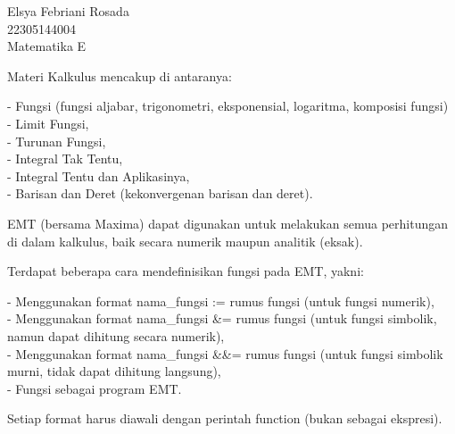 \documentclass{article}
\begin{document}
\begin{eulernotebook}
\begin{eulercomment}
Elsya Febriani Rosada\\
22305144004\\
Matematika E

\begin{eulercomment}
\begin{eulercomment}
Materi Kalkulus mencakup di antaranya:

- Fungsi (fungsi aljabar, trigonometri, eksponensial, logaritma,
komposisi fungsi)\\
- Limit Fungsi,\\
- Turunan Fungsi,\\
- Integral Tak Tentu,\\
- Integral Tentu dan Aplikasinya,\\
- Barisan dan Deret (kekonvergenan barisan dan deret).

EMT (bersama Maxima) dapat digunakan untuk melakukan semua perhitungan
di dalam kalkulus, baik secara numerik maupun analitik (eksak).

\end{eulercomment}
\begin{eulercomment}
Terdapat beberapa cara mendefinisikan fungsi pada EMT, yakni:

- Menggunakan format nama\_fungsi := rumus fungsi (untuk fungsi
numerik),\\
- Menggunakan format nama\_fungsi \&= rumus fungsi (untuk fungsi
simbolik, namun dapat dihitung secara numerik),\\
- Menggunakan format nama\_fungsi \&\&= rumus fungsi (untuk fungsi
simbolik murni, tidak dapat dihitung langsung),\\
- Fungsi sebagai program EMT.

Setiap format harus diawali dengan perintah function (bukan sebagai
ekspresi).


\end{eulercomment}
\end{eulercomment}
\end{eulercomment}
\end{eulernotebook}
\end{document}

